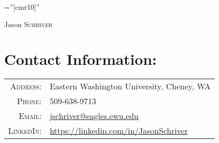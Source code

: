 \documentclass[a4paper,10pt]{article}
\begin{document}

\pagestyle{empty} %

\font\fb=''[cmr10]'' %

\par

{\centering
		{\Large Jason \textsc{Schriver}
	}
\bigskip
\par
}

\section{Contact Information:}
\begin{tabular}{rl}
    \textsc{Address:}   & Eastern Washington University, Cheney, WA \\
    \textsc{Phone:}     & 509-638-9713\\
    \textsc{Email:}     & \href{mailto:jschriver@eagles.ewu.edu}{jschriver@eagles.ewu.edu}\\
    \textsc{LinkedIn:}	& \url{https://linkedin.com/in/JasonSchriver}
\end{tabular}

\end{document}

